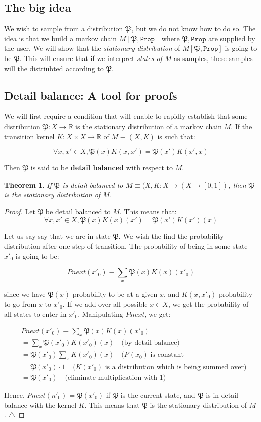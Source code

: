 \documentclass[titlepage]{article}
\newcommand{\R}{\mathbb{R}}
\renewcommand{\P}{\mathfrak{P}}
\newcommand{\Prop}{\texttt{Prop}}
\newcommand{\qed}{\ensuremath{\triangle}}
\newtheorem{theorem}{Theorem}
\newtheorem{proof}{Proof}[theorem]
\begin{document}
\subsection{The big idea}
We wish to sample from a distribution $\P$, but we do not know how to do so.
The idea is that we build a markov chain $M[\P, \Prop]$ where $\P, \Prop$ are
supplied by the user. We will show that the \emph{stationary distribution} of $M[\P, \Prop]$
is going to be $\P$. This will ensure that if we interpret \emph{states of $M$} as samples,
these samples will the distriubted according to $\P$.

\subsection{Detail balance: A tool for proofs}
We will first require a condition that will enable to rapidly establish that some
distribution $\P: X \rightarrow \R$ is the stationary distribution of a markov chain $M$. If
the transition kernel $K: X \times X \rightarrow \R$ of $M \equiv (X, K)$ is such that:

$$
\forall x, x' \in X, \P(x) K(x, x') = \P(x') K(x', x)
$$

Then $\P$ is said to be \textbf{detail balanced} with respect to $M$.

\begin{theorem}
If $\P$ is detail balanced to $M \equiv (X, K: X \rightarrow (X \rightarrow [0, 1])$,
then $\P$ is the stationary distribution of $M$.
\end{theorem}
\begin{proof}
Let $\P$ be detail balanced to $M$. This means that:
$$
\forall x, x' \in X, \P(x) K(x)(x') = \P(x') K(x')(x)
$$

Let us say say that we are in state $\P$. We wish the find the probability
distribution after one step of transition. The probability of being
in some state $x'_0$ is going to be:

$$
Pnext(x'_0) \equiv \sum_x \P(x) K(x)(x'_0)
$$

since we have $\P(x)$ probability to be at a given $x$, and
$K(x, x'_0)$  probability to go from $x$ to $x'_0$. If we add over all possible
$x \in X$, we get the probability of all states to enter in $x'_0$.
Manipulating $Pnext$, we get:

\begin{align*}
&Pnext(x'_0) \equiv \sum_x \P(x) K(x)(x'_0) \\
&= \sum_x \P(x'_0) K(x'_0)(x) \quad \text{(by detail balance)} \\
&= \P(x'_0) \sum_x K(x'_0)(x) \quad \text{($P(x_0)$ is constant} \\
&= \P(x'_0) \cdot 1 \quad \text{($K(x'_0)$ is a distribution which is being summed over)} \\
&= \P(x'_0) \quad \text{(eliminate multiplication with 1)}
\end{align*}

Hence, $Pnext(n'_0) = \P(x'_0)$ if $\P$ is the current state, and $\P$
is in detail balance with the kernel $K$.
This means that $\P$ is the stationary distribution of $M$.
\qed
\end{proof}
\end{document}
